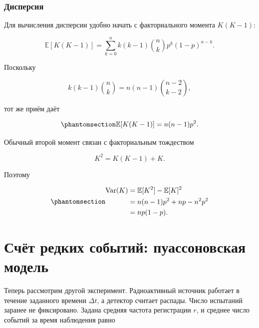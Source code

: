 \documentclass[
  russian,
  11pt,
  a4paper,
  open=any]{scrbook}
\begin{document}
\begin{bookderivation}

\subsubsection{Дисперсия}\label{ux434ux438ux441ux43fux435ux440ux441ux438ux44f-1}

Для вычисления дисперсии удобно начать с факториального момента
\(K(K-1)\):

\[
\mathbb E[K(K-1)]
=\sum_{k=0}^{n}k(k-1)\binom{n}{k}p^k(1-p)^{n-k}.
\]

Поскольку

\[
k(k-1)\binom{n}{k}
=n(n-1)\binom{n-2}{k-2},
\]

тот же приём даёт

\begin{equation}\protect\phantomsection\label{eq-binomial-second-factorial-moment}{
\mathbb E[K(K-1)]=n(n-1)p^2.
}\end{equation}

Обычный второй момент связан с факториальным тождеством

\[
K^2=K(K-1)+K.
\]

Поэтому

\begin{equation}\protect\phantomsection\label{eq-binomial-variance}{
\begin{aligned}
\operatorname{Var}(K)
&=\mathbb E[K^2]-\mathbb E[K]^2\\
&=n(n-1)p^2+np-n^2p^2\\
&=np(1-p).
\end{aligned}
}\end{equation}

\end{bookderivation}

\section{Счёт редких событий: пуассоновская
модель}\label{ux441ux447ux451ux442-ux440ux435ux434ux43aux438ux445-ux441ux43eux431ux44bux442ux438ux439-ux43fux443ux430ux441ux441ux43eux43dux43eux432ux441ux43aux430ux44f-ux43cux43eux434ux435ux43bux44c}

Теперь рассмотрим другой эксперимент. Радиоактивный источник работает в
течение заданного времени \(\Delta t\), а детектор считает распады.
Число испытаний заранее не фиксировано. Задана средняя частота
регистрации \(r\), и среднее число событий за время наблюдения равно
\end{document}
